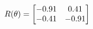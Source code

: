 \documentclass[preview]{standalone}
\begin{document}
\begin{align*}
\special{dvisvgm:raw <g id='unique000'>}R(\theta) = \begin{bmatrix}-0.91 & 0.41\\-0.41 & -0.91\end{bmatrix}\special{dvisvgm:raw </g>}
\end{align*}
\end{document}
